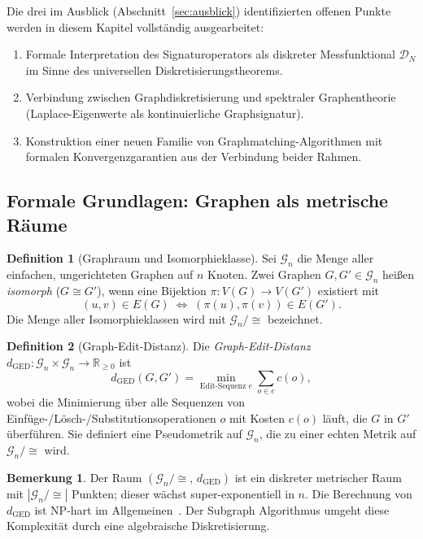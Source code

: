 ﻿\documentclass[a4paper,12pt]{article}
\theoremstyle{definition}
\newtheorem{definition}{Definition}
\newtheorem{bemerkung}{Bemerkung}
\begin{document}
Die drei im Ausblick (Abschnitt~\ref{sec:ausblick}) identifizierten offenen Punkte werden in
diesem Kapitel vollständig ausgearbeitet:
\begin{enumerate}
    \item Formale Interpretation des Signaturoperators als diskreter Messfunktional
          $\mathcal{D}_N$ im Sinne des universellen Diskretisierungstheorems.
    \item Verbindung zwischen Graphdiskretisierung und spektraler Graphentheorie
          (Laplace-Eigenwerte als kontinuierliche Graphsignatur).
    \item Konstruktion einer neuen Familie von Graphmatching-Algorithmen mit formalen
          Konvergenzgarantien aus der Verbindung beider Rahmen.
\end{enumerate}

\subsection{Formale Grundlagen: Graphen als metrische Räume}

\begin{definition}[Graphraum und Isomorphieklasse]
    Sei $\mathcal{G}_n$ die Menge aller einfachen, ungerichteten Graphen auf $n$ Knoten.
    Zwei Graphen $G, G' \in \mathcal{G}_n$ heißen \emph{isomorph} ($G \cong G'$), wenn eine
    Bijektion $\pi : V(G) \to V(G')$ existiert mit
    \[
    (u,v) \in E(G) \;\Longleftrightarrow\; (\pi(u), \pi(v)) \in E(G').
    \]
    Die Menge aller Isomorphieklassen wird mit $\mathcal{G}_n/{\cong}$ bezeichnet.
\end{definition}

\begin{definition}[Graph-Edit-Distanz]
    Die \emph{Graph-Edit-Distanz} $d_{\mathrm{GED}} : \mathcal{G}_n \times \mathcal{G}_n \to \mathbb{R}_{\geq 0}$ ist
    \[
    d_{\mathrm{GED}}(G, G') = \min_{\text{Edit-Sequenz } e} \sum_{o \in e} c(o),
    \]
    wobei die Minimierung über alle Sequenzen von Einfüge-/Lösch-/Substitutionsoperationen
    $o$ mit Kosten $c(o)$ läuft, die $G$ in $G'$ überführen. Sie definiert eine Pseudometrik
    auf $\mathcal{G}_n$, die zu einer echten Metrik auf $\mathcal{G}_n/{\cong}$ wird.
\end{definition}

\begin{bemerkung}
    Der Raum $(\mathcal{G}_n/{\cong},\, d_{\mathrm{GED}})$ ist ein diskreter metrischer Raum
    mit $|\mathcal{G}_n/{\cong}|$ Punkten; dieser wächst super-exponentiell in $n$.
    Die Berechnung von $d_{\mathrm{GED}}$ ist NP-hart im Allgemeinen~\cite{zeng2009}.
    Der Subgraph Algorithmus umgeht diese Komplexität durch eine algebraische Diskretisierung.
\end{bemerkung}
\end{document}
